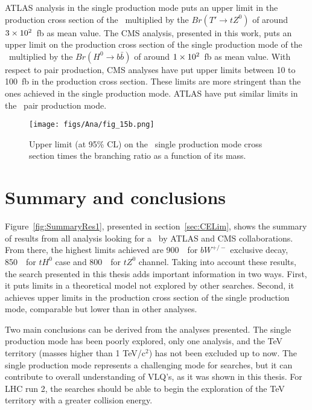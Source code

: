 ATLAS analysis in the single production mode puts an upper limit in the production cross section of the \Tp~multiplied by the $Br(T'\to tZ^{0})$ of around $3\times 10^{2}$~fb as mean value. The CMS analysis, presented in this work, puts an upper limit on the production cross section of the single production mode of the \Tp~multiplied by the $Br(H^{0}\to b\bar{b})$ of around $1\times 10^{2}$~fb as mean value. With respect to pair production, CMS analyses have put upper limits between 10 to 100~fb in the production cross section. These limits are more stringent than the ones achieved in the single production mode. ATLAS have put similar limits in the \Tp~pair production mode.

\begin{figure}[!Hhtbp]
  \begin{center}
    \texttt{[image: figs/Ana/fig\_15b.png]}
    \caption{Upper limit (at 95\% CL) on the \Tp~single production mode cross section times the branching ratio as a function of its mass.}
    \label{fig:SingleATLASres}
  \end{center}
\end{figure}

\section{Summary and conclusions}
\label{sec:SumCon}

Figure~\ref{fig:SummaryRes1}, presented in section~\ref{sec:CELim}, shows the summary of results from all analysis looking for a \Tp~by ATLAS and CMS collaborations. From there, the highest limits achieved are 900~\GeVcc~for $bW^{+/-}$ exclusive decay, 850~\GeVcc~for $tH^{0}$ case and 800~\GeVcc~for $tZ^{0}$ channel. Taking into account these results, the search presented in this thesis adds important information in two ways. First, it puts limits in a theoretical model not explored by other searches. Second, it achieves upper limits in the production cross section of the single production mode, comparable but lower than in other analyses.


Two main conclusions can be derived from the analyses presented. The single production mode has been poorly explored, only one analysis, and the TeV territory (masses higher than 1 TeV/$\text{c}^{2}$) has not been excluded up to now. The single production mode represents a challenging mode for searches, but it can contribute to overall understanding of VLQ's, as it was shown in this thesis. For LHC run 2, the searches should be able to begin the exploration of the TeV territory with a greater collision energy. 
